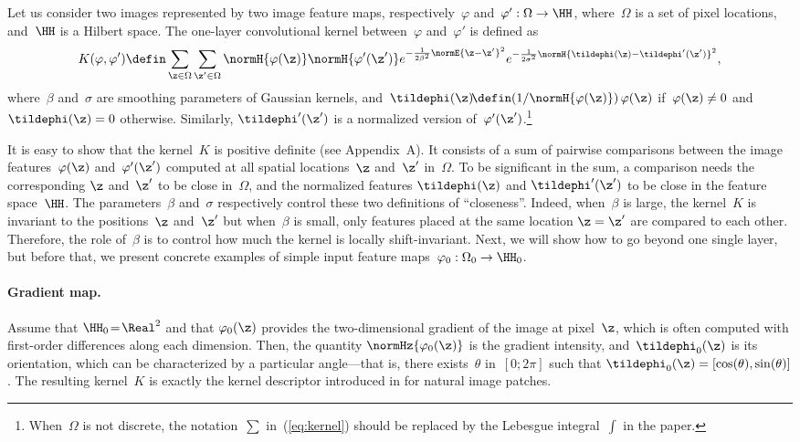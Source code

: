 \begin{definition} \label{def:scattering}
   Let us consider two images represented by two
   image feature maps, respectively~$\varphi$ and~$\varphi': \Omega \to \HH$,
   where~$\Omega$ is a set of pixel locations, and~$\HH$ is a Hilbert space.
   The one-layer convolutional kernel between~$\varphi$ and~$\varphi'$ is defined as 
  \begin{equation}
     K(\varphi,\varphi') \defin \sum_{\z \in \Omega} \sum_{\z' \in \Omega} \normH{\varphi(\z)}  \normH{\varphi'(\z')} e^{-\frac{1}{2\beta^2}\normE{\z-\z'}^2} e^{-\frac{1}{2\sigma^2} \normH{\tildephi(\z)-\tildephi'(\z')}^2}, \label{eq:kernel}
  \end{equation}
  where~$\beta$ and~$\sigma$ are smoothing parameters of Gaussian kernels,
  and~$\tildephi(\z) \!\defin\!  \left(1/\normH{\varphi(\z)}\right)\varphi(\z)$ if~$\varphi(\z) \neq 0$ and~$\tildephi(\z)=0$ otherwise.
  Similarly, $\tildephi'(\z')$ is a normalized version of~$\varphi'(\z')$.\footnote{When~$\Omega$ is not discrete, the notation~$\sum$ in~(\ref{eq:kernel}) should be replaced by the Lebesgue integral~$\int$ in the paper.}
\end{definition}
\vspace*{-0.1cm}
It is easy to show that the kernel~$K$ is positive definite (see Appendix~A). It consists of a sum of pairwise
comparisons between the image features~$\varphi(\z)$ and~$\varphi'(\z')$ computed at
all spatial locations~$\z$ and~$\z'$ in~$\Omega$. To be significant in the sum, a
comparison needs the corresponding $\z$ and~$\z'$ to be close 
in~$\Omega$, and the normalized features $\tildephi(\z)$ and
$\tildephi'(\z')$ to be close in the feature space~$\HH$. 
The parameters~$\beta$ and~$\sigma$ respectively control these two definitions
of ``closeness''. Indeed, when~$\beta$
is large, the kernel~$K$ is invariant to the positions~$\z$ and~$\z'$ but
when~$\beta$ is small, only features placed at the same location $\z=\z'$ are
compared to each other. Therefore, the role of~$\beta$ is to control how much the kernel
is locally shift-invariant. Next, we will show how to go beyond one single
layer, but before that, we present concrete examples of simple input
feature maps~$\varphi_0: \Omega_0 \to \HH_0$.
\vs
\paragraph{Gradient map.} Assume that $\HH_0\!=\!\Real^2$ and that
$\varphi_0(\z)$ provides the two-dimensional gradient of the image at
pixel~$\z$, which is often computed with first-order differences along each
dimension. Then, the quantity $\normHz{\varphi_0(\z)}$ is the gradient intensity, and~$\tildephi_0(\z)$ is its orientation,
which can be characterized by a particular angle---that is, there exists~$\theta$
in~$[0; 2\pi]$ such that $\tildephi_0(\z) = [\cos(\theta),\sin(\theta)]$. The
resulting kernel~$K$ is exactly the kernel descriptor introduced in
\cite{bo2011,bo2010} for natural image patches.

